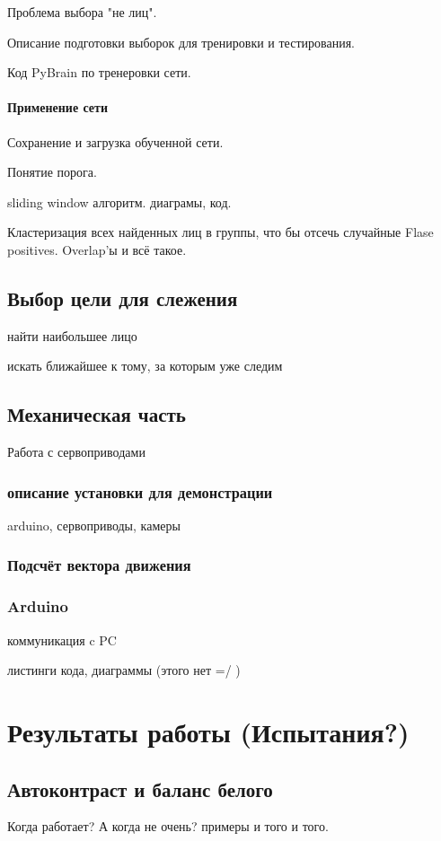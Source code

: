 \documentclass[12pt]{report}
\begin{document}
Проблема выбора "не лиц".

Описание подготовки выборок для тренировки и тестирования.

Код PyBrain по тренеровки сети.
\subsubsection{Применение сети}
Сохранение и загрузка обученной сети.

Понятие порога.

sliding window алгоритм. диаграмы, код.

Кластеризация всех найденных лиц в группы, что бы отсечь случайные Flase positives. Overlap'ы и всё такое.
\section{Выбор цели для слежения}
найти наибольшее лицо

искать ближайшее к тому, за которым уже следим
\section{Механическая часть}
Работа с сервоприводами
\subsection{описание установки для демонстрации}
arduino,
сервоприводы,
камеры
\subsection{Подсчёт вектора движения}
\subsection{Arduino}
коммуникация c PC

листинги кода, диаграммы (этого нет =/ )


\chapter{Результаты работы (Испытания?)}
\thispagestyle{fancy}

\section{Автоконтраст и баланс белого}
Когда работает? А когда не очень? примеры и того и того.
\end{document}
